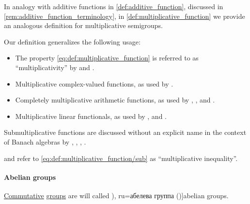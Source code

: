 \begin{remark}\label{rem:multiplicative_function_terminology}
  In analogy with additive functions in \cref{def:additive_function}, discussed in \cref{rem:additive_function_terminology}, in \cref{def:multiplicative_function} we provide an analogous definition for multiplicative semigroups.

  Our definition generalizes the following usage:
  \begin{itemize}
    \item The property \eqref{eq:def:multiplicative_function} is referred to as \enquote{multiplicativity} by  and .

    \item Multiplicative complex-valued functions, as used by .

    \item Completely multiplicative arithmetic functions, as used by ,
    ,
     and .

    \item Multiplicative linear functionals, as used by ,
     and .
  \end{itemize}

  Submultiplicative functions are discussed without an explicit name in the context of Banach algebras by
  ,
  ,
  ,
  .

   and  refer to \eqref{eq:def:multiplicative_function/sub} as \enquote{multiplicative inequality}.
\end{remark}

\paragraph{Abelian groups}

\begin{definition}\label{def:abelian_group}
  \hyperref[def:binary_operation/commutative]{Commutative} \hyperref[def:group]{groups} are will called \term[bg=абелева группа (\cite[390]{Обрешков1962ВисшаАлгебра}), ru=абелева группа (\cite[def. 1.1.1]{Винберг2014КурсАлгебры})]{abelian groups}.
\end{definition}

